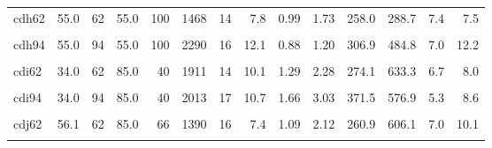 \begin{landscape}
\begin{longtable}[t]{lrrrrrrrrrrrrr}
cdh62 & 55.0 & 62 & 55.0 & 100 & 1468 & 14 & 7.8 & 0.99 & 1.73 & 258.0 & 288.7 & 7.4 & 7.5\\
\cellcolor{gray!6}{cdh78} & \cellcolor{gray!6}{55.0} & \cellcolor{gray!6}{78} & \cellcolor{gray!6}{55.0} & \cellcolor{gray!6}{100} & \cellcolor{gray!6}{1634} & \cellcolor{gray!6}{13} & \cellcolor{gray!6}{8.7} & \cellcolor{gray!6}{0.99} & \cellcolor{gray!6}{1.59} & \cellcolor{gray!6}{295.6} & \cellcolor{gray!6}{474.3} & \cellcolor{gray!6}{7.0} & \cellcolor{gray!6}{8.9}\\
cdh94 & 55.0 & 94 & 55.0 & 100 & 2290 & 16 & 12.1 & 0.88 & 1.20 & 306.9 & 484.8 & 7.0 & 12.2\\
\cellcolor{gray!6}{cdi46} & \cellcolor{gray!6}{34.0} & \cellcolor{gray!6}{46} & \cellcolor{gray!6}{85.0} & \cellcolor{gray!6}{40} & \cellcolor{gray!6}{1269} & \cellcolor{gray!6}{51} & \cellcolor{gray!6}{6.7} & \cellcolor{gray!6}{1.17} & \cellcolor{gray!6}{3.15} & \cellcolor{gray!6}{323.6} & \cellcolor{gray!6}{671.0} & \cellcolor{gray!6}{6.9} & \cellcolor{gray!6}{12.8}\\
cdi62 & 34.0 & 62 & 85.0 & 40 & 1911 & 14 & 10.1 & 1.29 & 2.28 & 274.1 & 633.3 & 6.7 & 8.0\\
\cellcolor{gray!6}{cdi78} & \cellcolor{gray!6}{34.0} & \cellcolor{gray!6}{78} & \cellcolor{gray!6}{85.0} & \cellcolor{gray!6}{40} & \cellcolor{gray!6}{2050} & \cellcolor{gray!6}{10} & \cellcolor{gray!6}{10.9} & \cellcolor{gray!6}{1.65} & \cellcolor{gray!6}{2.55} & \cellcolor{gray!6}{347.1} & \cellcolor{gray!6}{560.0} & \cellcolor{gray!6}{5.7} & \cellcolor{gray!6}{8.4}\\
cdi94 & 34.0 & 94 & 85.0 & 40 & 2013 & 17 & 10.7 & 1.66 & 3.03 & 371.5 & 576.9 & 5.3 & 8.6\\
\cellcolor{gray!6}{cdj46} & \cellcolor{gray!6}{56.1} & \cellcolor{gray!6}{46} & \cellcolor{gray!6}{85.0} & \cellcolor{gray!6}{66} & \cellcolor{gray!6}{1652} & \cellcolor{gray!6}{67} & \cellcolor{gray!6}{8.7} & \cellcolor{gray!6}{1.07} & \cellcolor{gray!6}{2.35} & \cellcolor{gray!6}{344.1} & \cellcolor{gray!6}{519.3} & \cellcolor{gray!6}{8.7} & \cellcolor{gray!6}{9.2}\\
cdj62 & 56.1 & 62 & 85.0 & 66 & 1390 & 16 & 7.4 & 1.09 & 2.12 & 260.9 & 606.1 & 7.0 & 10.1\\
\cellcolor{gray!6}{cdj78} & \cellcolor{gray!6}{56.1} & \cellcolor{gray!6}{78} & \cellcolor{gray!6}{85.0} & \cellcolor{gray!6}{66} & \cellcolor{gray!6}{1334} & \cellcolor{gray!6}{14} & \cellcolor{gray!6}{7.1} & \cellcolor{gray!6}{1.22} & \cellcolor{gray!6}{1.95} & \cellcolor{gray!6}{286.9} & \cellcolor{gray!6}{286.9} & \cellcolor{gray!6}{6.6} & \cellcolor{gray!6}{7.3}\\

\end{longtable}
\end{landscape}
